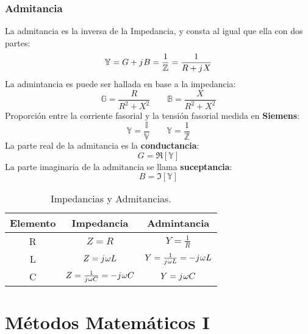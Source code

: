 \documentclass[
	12pt, %
	fleqn, %
	a4paper, %
	oneside, %
]{LegrandOrangeBook}
\begin{document}
\section{Admitancia}\label{Admitancia}
La admitancia es la inversa de la Impedancia, y consta al igual que ella con dos partes:
\begin{equation*}
\mathbb{Y}=G+{j\mkern1mu} B=\frac{1}{\mathbb{Z}}=\frac{1}{R+{j\mkern1mu} X}
\end{equation*}
La admintancia es puede ser hallada en base a la impedancia:
\begin{equation*}
\mathbb{G}=\frac{R}{R^2+X^2}
\qquad
\mathbb{B}=\frac{X}{R^2+X^2}
\end{equation*}
Proporción entre la corriente fasorial y la tensión fasorial medida en \textbf{Siemens}:
\begin{equation*}
\mathbb{Y}=\frac{\mathbb{I}}{\mathbb{V}}
\qquad
\mathbb{Y}=\frac{1}{\mathbb{Z}}
\end{equation*}
La parte real de la admitancia es la \textbf{conductancia}:
\begin{displaymath}
G=\Re[\mathbb{Y}]
\end{displaymath}
La parte imaginaria de la admitancia se llama \textbf{suceptancia}:
\begin{displaymath}
B=\Im[\mathbb{Y}]
\end{displaymath}
\begin{table}[]
\begin{center}
\begin{tabular}{|c|c|c|}
\hline
\rowcolor[HTML]{CBCEFB} 
Elemento & Impedancia                & Admintancia               \\ \hline
R        & $Z=R$                     & $Y=\frac{1}{R}$           \\ \hline
L        & $Z={j\mkern1mu}\omega L$           & $Y=\frac{1}{{j\mkern1mu}\omega L}=-{j\mkern1mu}\omega L$ \\ \hline
C        & $Z=\frac{1}{{j\mkern1mu}\omega C}=-{j\mkern1mu}\omega C$ & $Y={j\mkern1mu}\omega C$           \\ \hline
\end{tabular}
\end{center}
\caption{Impedancias y Admitancias.}
\end{table}
\part{Métodos Matemáticos I}
\end{document}
